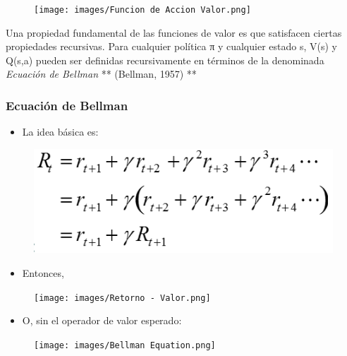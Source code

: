 \documentclass[11pt]{article}
\makeatletter
\def\maxwidth{\ifdim\Gin@nat@width>\linewidth\linewidth
    \else\Gin@nat@width\fi}
\let\Oldincludegraphics\includegraphics
\renewcommand{\includegraphics}[1]{\Oldincludegraphics[width=.8\maxwidth]{#1}}
\providecommand{\tightlist}{%
      \setlength{\itemsep}{0pt}\setlength{\parskip}{0pt}}
\makeatother
\begin{document}
\begin{figure}
\centering
\texttt{[image: images/Funcion de Accion Valor.png]}
\caption{}
\end{figure}

Una propiedad fundamental de las funciones de valor es que satisfacen
ciertas propiedades recursivas. Para cualquier política π y cualquier
estado s, V(s) y Q(s,a) pueden ser definidas recursivamente en términos
de la denominada \emph{Ecuación de Bellman} ** (Bellman, 1957) **

    \subsubsection{Ecuación de Bellman}\label{ecuaciuxf3n-de-bellman}

\begin{itemize}
\tightlist
\item
  La idea básica es:
\end{itemize}

\begin{figure}
\centering
\includegraphics{images/Retorno.png}
\caption{}
\end{figure}

\begin{itemize}
\tightlist
\item
  Entonces,
\end{itemize}

\begin{figure}
\centering
\texttt{[image: images/Retorno - Valor.png]}
\caption{}
\end{figure}

\begin{itemize}
\tightlist
\item
  O, sin el operador de valor esperado:
\end{itemize}

\begin{figure}
\centering
\texttt{[image: images/Bellman Equation.png]}
\caption{}
\end{figure}
\end{document}
